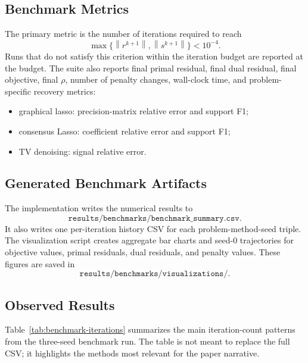\documentclass[11pt]{article}
\newcommand{\norm}[1]{\left\lVert #1 \right\rVert}
\begin{document}
\subsection{Benchmark Metrics}

The primary metric is the number of iterations required to reach
\begin{equation}
    \max\{\norm{r^{k+1}},\norm{s^{k+1}}\}<10^{-4}.
\end{equation}
Runs that do not satisfy this criterion within the iteration budget are
reported at the budget.  The suite also reports final primal residual, final
dual residual, final objective, final $\rho$, number of penalty changes,
wall-clock time, and problem-specific recovery metrics:
\begin{itemize}
    \item graphical lasso: precision-matrix relative error and support F1;
    \item consensus Lasso: coefficient relative error and support F1;
    \item TV denoising: signal relative error.
\end{itemize}

\subsection{Generated Benchmark Artifacts}

The implementation writes the numerical results to
\begin{equation}
    \texttt{results/benchmarks/benchmark\_summary.csv}.
\end{equation}
It also writes one per-iteration history CSV for each
problem-method-seed triple.  The visualization script creates aggregate bar
charts and seed-0 trajectories for objective values, primal residuals, dual
residuals, and penalty values.  These figures are saved in
\begin{equation}
    \texttt{results/benchmarks/visualizations/}.
\end{equation}

\subsection{Observed Results}

Table~\ref{tab:benchmark-iterations} summarizes the main iteration-count
patterns from the three-seed benchmark run.  The table is not meant to replace
the full CSV; it highlights the methods most relevant for the paper narrative.
\end{document}
